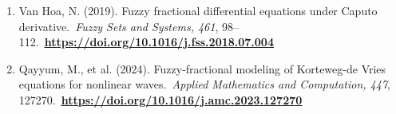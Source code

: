 \begin{enumerate}
  Sheinov, V. V., \& Dziavitsyn, I. A. (2021). Modeling cognitive, behavioural, and emotional interplay in addiction: A three-factor fractional approach. \emph{Chaos, Solitons \& Fractals, 144}, 110695. \href{https://doi.org/10.1016/j.chaos.2021.110695}{\ul{https://doi.org/10.1016/j.chaos.2021.110695}}
\item
  Van Hoa, N. (2019). Fuzzy fractional differential equations under Caputo derivative.~\emph{Fuzzy Sets and Systems, 461}, 98--112.~\href{https://doi.org/10.1016/j.fss.2018.07.004}{\textbf{\ul{https://doi.org/10.1016/j.fss.2018.07.004}}}
\item
  Qayyum, M., et al. (2024). Fuzzy-fractional modeling of Korteweg-de Vries equations for nonlinear waves.~\emph{Applied Mathematics and Computation, 447}, 127270.~\href{https://doi.org/10.1016/j.amc.2023.127270}{\textbf{\ul{https://doi.org/10.1016/j.amc.2023.127270}}}
\end{enumerate}